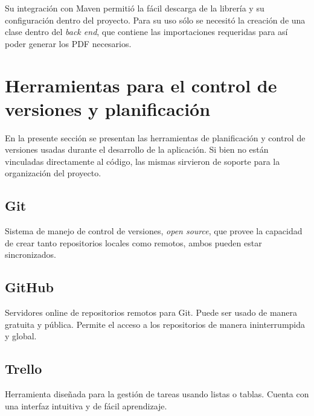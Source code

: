         Su integración con Maven permitió la fácil descarga de la librería y su configuración dentro del proyecto. Para su uso sólo se necesitó la creación de una clase dentro del \textit{back end}, que contiene las importaciones requeridas para así poder generar los PDF necesarios.
        
    \section{Herramientas para el control de versiones y planificación}
    
    En la presente sección se presentan las herramientas de planificación y control de versiones usadas durante el desarrollo de la aplicación. Si bien no están vinculadas directamente al código, las mismas sirvieron de soporte para la organización del proyecto.
    
        \subsection{Git}
        \label{tecno-git}
        
        Sistema de manejo de control de versiones, \textit{open source}, que provee la capacidad de crear tanto repositorios locales como remotos, ambos pueden estar sincronizados.
        
        \subsection{GitHub}
        \label{tecno-github}
        
        Servidores online de repositorios remotos para Git. Puede ser usado de manera gratuita y pública. Permite el acceso a los repositorios de manera ininterrumpida y global.
        
        \subsection{Trello}
        \label{tecno-trello}
        
        Herramienta diseñada para la gestión de tareas usando listas o tablas. Cuenta con una interfaz intuitiva y de fácil aprendizaje.
    
\pagebreak